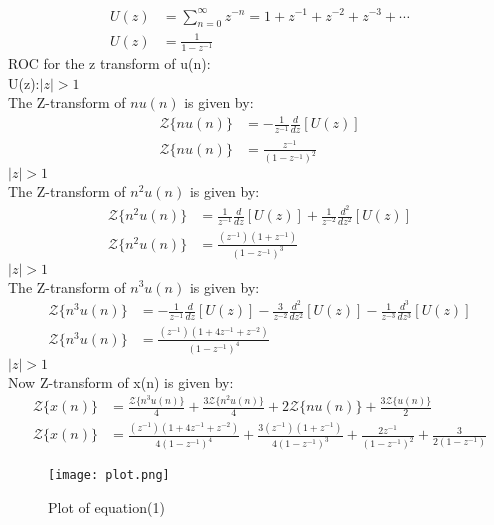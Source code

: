 \documentclass{article}
\begin{document}
\begin{align}
U(z) &= \sum_{n=0}^{\infty} z^{-n} = 1 + z^{-1} + z^{-2} + z^{-3} + \dotsb  \\
U(z) &= \frac{1}{1- z^{-1}}
\end{align}
ROC for the z transform of u(n):\\
 U(z):$\lvert z \rvert > 1$\\
The Z-transform of $nu(n)$ is given by:
\begin{align}
\mathcal{Z}\{nu(n)\} &= -\frac{1}{z^{-1}} \frac{d}{dz}[U(z)]\\
\mathcal{Z}\{nu(n)\} &= \frac{z^{-1}}{(1 - z^{-1})^2}
\end{align}
 $\lvert z \rvert > 1$\\
The Z-transform of $n^2u(n)$ is given by:
\begin{align}
\mathcal{Z}\{n^2u(n)\} &= \frac{1}{z^{-1}} \frac{d}{dz}[U(z)] + \frac{1}{z^{-2}} \frac{d^2}{dz^2}[U(z)]\\
\mathcal{Z}\{n^2u(n)\} &= \frac{(z^{-1})(1+z^{-1})}{(1-z^{-1})^3}
\end{align}
 $\lvert z \rvert > 1$\\
The Z-transform of $n^3u(n)$ is given by:
\begin{align}
\mathcal{Z}\{n^3u(n)\} &= -\frac{1}{z^{-1}} \frac{d}{dz}[U(z)] - \frac{3}{z^{-2}} \frac{d^2}{dz^2}[U(z)] - \frac{1}{z^{-3}} \frac{d^3}{dz^3}[U(z)]\\
\mathcal{Z}\{n^3u(n)\} &= \frac{(z^{-1})(1+4z^{-1}+z^{-2})}{(1-z^{-1})^4}
\end{align}
 $\lvert z \rvert > 1$\\
Now Z-transform of x(n) is given by:
\begin{align}
\mathcal{Z}\{x(n)\} &=\frac{\mathcal{Z}\{n^3u(n)\}}{4} +\frac{3\mathcal{Z}\{n^2u(n)\}}{4} +2\mathcal{Z}\{nu(n)\} +\frac{3\mathcal{Z}\{u(n)\}}{2}\\
\mathcal{Z}\{x(n)\} &=\frac{(z^{-1})(1+4z^{-1}+z^{-2})}{4(1-z^{-1})^4} +\frac{3(z^{-1})(1+z^{-1})}{4(1-z^{-1})^3} +\frac{2z^{-1}}{(1 - z^{-1})^2} +\frac{3}{2(1- z^{-1})}
\end{align}
\newpage


\begin{figure}
    \centering
    \texttt{[image: plot.png]}
    \caption{Plot of equation(1)}
    \label{fig:plot}
\end{figure}
\end{document}
